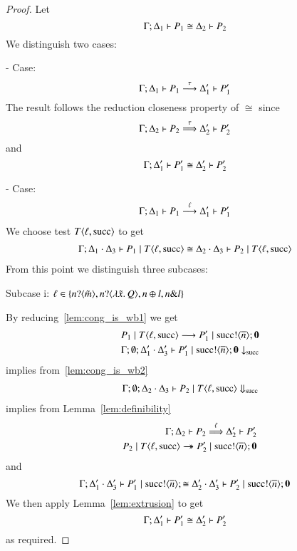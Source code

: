 \begin{proof}
	\noi Let
	\[
		\Gamma; \Delta_1 \vdash P_1 \cong \Delta_2 \vdash P_2
	\]
	\noi We distinguish two cases:

	\noi - Case:
	\[
		\Gamma; \Delta_1 \vdash P_1 \stackrel{\tau}{\longrightarrow} \Delta_1' \vdash P_1'
	\]
	\noi The result follows the reduction closeness property of $\cong$ since
	\[
		\Gamma; \Delta_2 \vdash P_2 \stackrel{\tau}{\Longrightarrow} \Delta_2' \vdash P_2'
	\]
	\noi and
	\[
		\Gamma; \Delta_1' \vdash P_1' \cong \Delta_2' \vdash P_2'
	\]

	\noi - Case:
%
	\begin{eqnarray}
		\Gamma; \Delta_1 \vdash P_1 \stackrel{\ell}{\longrightarrow} \Delta_1' \vdash P_1'
		\label{lem:cong_is_wb1}
	\end{eqnarray}
%
	\noi We choose test $T\langle \ell, \textrm{succ} \rangle$ to get
%
	\begin{eqnarray}
		\Gamma; \Delta_1 \cdot \Delta_3 \vdash P_1 \;|\; T\langle \ell, \textrm{succ} \rangle \cong \Delta_2 \cdot \Delta_3 \vdash P_2 \;|\; T\langle \ell, \textrm{succ} \rangle
		\label{lem:cong_is_wb2}
	\end{eqnarray}
%
	\noi From this point we distinguish three subcases:

	\noi Subcase i: $\ell \in \{n ? \langle \tilde{m} \rangle, n ? \langle \lambda \tilde{x}.\,Q \rangle, n \oplus l, n \& l\}$

	\noi By reducing~\ref{lem:cong_is_wb1} we get
%
	\begin{eqnarray*}
		&& P_1 \;|\; T\langle \ell, \textrm{succ} \rangle \longrightarrow P_1' \;|\; \textrm{succ} ! \langle \overline{n} \rangle ; \mathbf{0} \\
		&& \Gamma; \emptyset; \Delta_1' \cdot \Delta_3' \vdash P_1' \;|\; \textrm{succ} ! \langle \overline{n} \rangle ; \mathbf{0} \downarrow_{\textrm{succ}}
	\end{eqnarray*}
%
	\noi implies from~\ref{lem:cong_is_wb2}
%
	\begin{eqnarray*}
		&& \Gamma; \emptyset; \Delta_2 \cdot \Delta_3 \vdash P_2 \;|\; T\langle \ell, \textrm{succ} \rangle \Downarrow_{\textrm{succ}}
	\end{eqnarray*}
%
	\noi implies from Lemma~\ref{lem:definibility}
%
	\begin{eqnarray*}
		&& \Gamma; \Delta_2 \vdash P_2 \stackrel{\ell}{\Longrightarrow} \Delta_2' \vdash P_2'\\
		&& P_2 \;|\; T \langle \ell, \textrm{succ} \rangle \rightarrow\!\!\!\!\!\rightarrow P_2' \;|\; \textrm{succ} ! \langle \overline{n} \rangle ; \mathbf{0}
	\end{eqnarray*}
%
	\noi and
%
	\[
		\Gamma; \Delta_1' \cdot \Delta_3' \vdash P_1' \;|\; \textrm{succ} ! \langle \overline{n} \rangle ; \cong \Delta_2' \cdot \Delta_3' \vdash P_2' \;|\; \textrm{succ} ! \langle \overline{n} \rangle ; \mathbf{0}
	\]
	We then apply Lemma~\ref{lem:extrusion} to get
%
	\[
		\Gamma; \Delta_1' \vdash P_1' \cong \Delta_2' \vdash P_2'
	\]
%
	\noi as required.


\end{proof}
